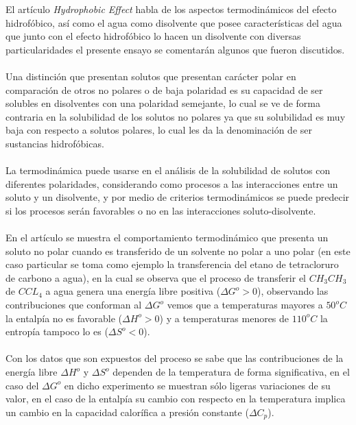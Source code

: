 \documentclass[10pt]{article}
\title{\bt{El agua y el efecto hidrofóbico}}
\author{Pérez Alvarado Luis Raymundo, Facultad de Química, UNAM}
\date{22 de octubre de 2020}
\newcommand{\np}[1]{\paragraph{\normalfont{#1}}}
\newcommand{\et}[1]{\emph{#1}}
\begin{document}
    \maketitle

    El artículo \et{Hydrophobic Effect} \cite{article:article} habla de los aspectos termodinámicos del efecto hidrofóbico, así como el agua como disolvente que posee características del agua que junto con el efecto hidrofóbico lo hacen un disolvente con diversas particularidades el presente ensayo\cite{web:Elsevier} se comentarán algunos que fueron discutidos. \np{}

    Una distinción que presentan solutos que presentan carácter polar en comparación de otros no polares o de baja polaridad es su capacidad de ser solubles en disolventes con una polaridad semejante, lo cual se ve de forma contraria en la solubilidad de los solutos no polares ya que su solubilidad es muy baja con respecto a solutos polares, lo cual les da la denominación de ser sustancias hidrofóbicas.\np{}

    La termodinámica puede usarse en el análisis de la solubilidad de solutos con diferentes polaridades, considerando como procesos a las interacciones entre un soluto y un disolvente, y por medio de criterios termodinámicos se puede predecir si los procesos serán favorables o no en las interacciones soluto-disolvente.\np{}

    En el artículo se muestra el comportamiento termodinámico que presenta un soluto no polar cuando es transferido de un solvente no polar a uno polar (en este caso particular se toma como ejemplo la transferencia del etano de tetracloruro de carbono a agua), en la cual se observa que el proceso de transferir el $CH_{3}CH_{3}$ de $CCL_{4}$ a agua genera una energía libre positiva ($\Delta G^o > 0$), observando las contribuciones que conforman al $\Delta G^o$ vemos que a temperaturas mayores a $50^o C$ la entalpía no es favorable ($\Delta H^o > 0$) y a temperaturas menores de $110^o C$ la entropía tampoco lo es ($\Delta S^o < 0$). \np{}

    Con los datos que son expuestos del proceso se sabe que las contribuciones de la energía libre $\Delta H^o$ y $\Delta S^o$ dependen de la temperatura de forma significativa, en el caso del $\Delta G^o$ en dicho experimento se muestran sólo ligeras variaciones de su valor, en el caso de la entalpía su cambio con respecto en la temperatura implica un cambio en la capacidad calorífica a presión constante ($\Delta C_{p}$). \np{}
\end{document}

